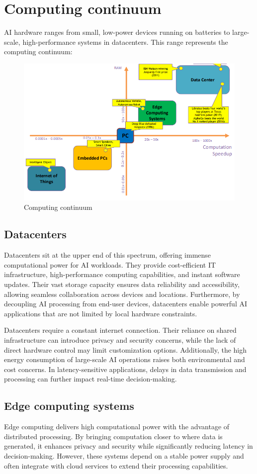 \section{Computing continuum}

AI hardware ranges from small, low-power devices running on batteries to large-scale, high-performance systems in datacenters.
This range represents the computing continuum: 
\begin{figure}[H]
    \centering
    \includegraphics[width=0.5\linewidth]{images/eeai2.png}
    \caption{Computing continuum}
\end{figure}

\subsection{Datacenters}
Datacenters sit at the upper end of this spectrum, offering immense computational power for AI workloads.
They provide cost-efficient IT infrastructure, high-performance computing capabilities, and instant software updates.
Their vast storage capacity ensures data reliability and accessibility, allowing seamless collaboration across devices and locations. 
Furthermore, by decoupling AI processing from end-user devices, datacenters enable powerful AI applications that are not limited by local hardware constraints.

Datacenters require a constant internet connection. 
Their reliance on shared infrastructure can introduce privacy and security concerns, while the lack of direct hardware control may limit customization options. 
Additionally, the high energy consumption of large-scale AI operations raises both environmental and cost concerns. 
In latency-sensitive applications, delays in data transmission and processing can further impact real-time decision-making.

\subsection{Edge computing systems}
Edge computing delivers high computational power with the advantage of distributed processing. 
By bringing computation closer to where data is generated, it enhances privacy and security while significantly reducing latency in decision-making. 
However, these systems depend on a stable power supply and often integrate with cloud services to extend their processing capabilities.

